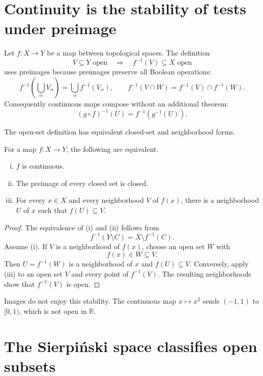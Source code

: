 
\section{Continuity is the stability of tests under preimage}

Let \(f:X\to Y\) be a map between topological spaces.  The definition
\[
  V\subseteq Y\text{ open}
  \quad\Longrightarrow\quad
  f^{-1}(V)\subseteq X\text{ open}
\]
uses preimages because preimages preserve all Boolean operations:
\[
  f^{-1}\!\left(\bigcup_\alpha V_\alpha\right)
  =\bigcup_\alpha f^{-1}(V_\alpha),
  \qquad
  f^{-1}(V\cap W)=f^{-1}(V)\cap f^{-1}(W).
\]
Consequently continuous maps compose without an additional theorem:
\[
  (g\circ f)^{-1}(U)=f^{-1}(g^{-1}(U)).
\]

The open-set definition has equivalent closed-set and neighborhood forms.

\begin{proposition}
For a map \(f:X\to Y\), the following are equivalent.
\begin{enumerate}[(i)]
  \item \(f\) is continuous.
  \item The preimage of every closed set is closed.
  \item For every \(x\in X\) and every neighborhood \(V\) of \(f(x)\), there is a neighborhood \(U\) of \(x\) such that \(f(U)\subseteq V\).
\end{enumerate}
\end{proposition}

\begin{proof}
The equivalence of (i) and (ii) follows from
\[
  f^{-1}(Y\setminus C)=X\setminus f^{-1}(C).
\]
Assume (i).  If \(V\) is a neighborhood of \(f(x)\), choose an open set \(W\) with
\[
  f(x)\in W\subseteq V.
\]
Then \(U=f^{-1}(W)\) is a neighborhood of \(x\) and \(f(U)\subseteq V\).  Conversely, apply (iii) to an open set \(V\) and every point of \(f^{-1}(V)\).  The resulting neighborhoods show that \(f^{-1}(V)\) is open.
\end{proof}

Images do not enjoy this stability.  The continuous map \(x\mapsto x^2\) sends \((-1,1)\) to \([0,1)\), which is not open in \(\mathbb R\).

\section{The Sierpiński space classifies open subsets}

